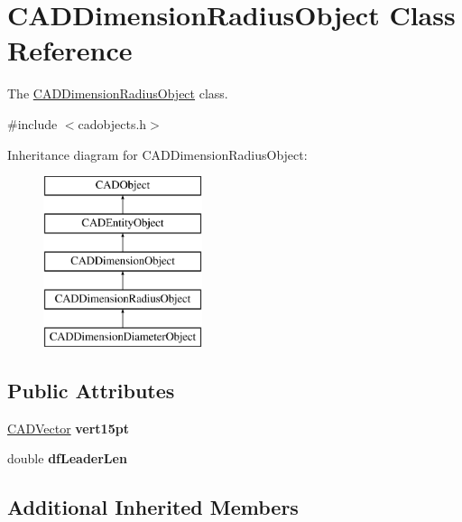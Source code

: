 \hypertarget{class_c_a_d_dimension_radius_object}{}\section{C\+A\+D\+Dimension\+Radius\+Object Class Reference}
\label{class_c_a_d_dimension_radius_object}


The \hyperlink{class_c_a_d_dimension_radius_object}{C\+A\+D\+Dimension\+Radius\+Object} class.  




{\ttfamily \#include $<$cadobjects.\+h$>$}

Inheritance diagram for C\+A\+D\+Dimension\+Radius\+Object\+:\begin{figure}[H]
\begin{center}
\leavevmode
\includegraphics[height=5.000000cm]{class_c_a_d_dimension_radius_object}
\end{center}
\end{figure}
\subsection*{Public Attributes}
\begin{DoxyCompactItemize}
\item 
\hyperlink{class_c_a_d_vector}{C\+A\+D\+Vector} {\bfseries vert15pt}\hypertarget{class_c_a_d_dimension_radius_object_a24c3c5ec18527cbb03ea38ea227d6ef0}{}\label{class_c_a_d_dimension_radius_object_a24c3c5ec18527cbb03ea38ea227d6ef0}

\item 
double {\bfseries df\+Leader\+Len}\hypertarget{class_c_a_d_dimension_radius_object_aeca09b0c2899e1e4c15e69b4262227e7}{}\label{class_c_a_d_dimension_radius_object_aeca09b0c2899e1e4c15e69b4262227e7}

\end{DoxyCompactItemize}
\subsection*{Additional Inherited Members}



